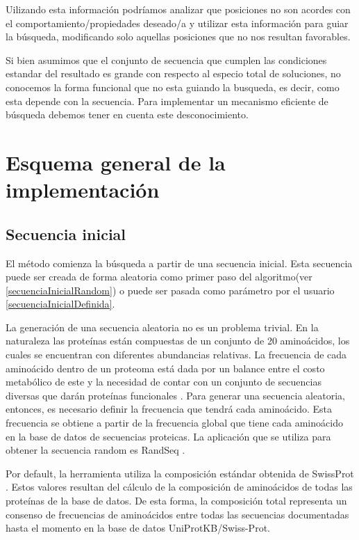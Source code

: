 Uilizando esta información podríamos analizar que posiciones no son acordes con el comportamiento/propiedades deseado/a y utilizar esta información para guiar la búsqueda, modificando solo aquellas posiciones que no nos resultan favorables.
 
Si bien asumimos que el conjunto de secuencia que cumplen las condiciones estandar del resultado es grande con respecto al especio total de soluciones, no conocemos la forma funcional que no esta guiando la busqueda,
es decir, como esta depende con la secuencia.  Para implementar un mecanismo eficiente de búsqueda debemos tener en cuenta este desconocimiento.










\section{Esquema general de la implementación}


\subsection{Secuencia inicial}

El método comienza la búsqueda a partir de una secuencia inicial. 
Esta secuencia puede ser creada de forma aleatoria como primer paso del algoritmo(ver \ref{secuenciaInicialRandom}) o puede ser pasada como parámetro por el usuario \ref{secuenciaInicialDefinida}. 

La generación de una secuencia aleatoria no es un problema trivial. 
En la naturaleza las proteínas están compuestas de un conjunto de 20 aminoácidos, los cuales se encuentran con diferentes abundancias relativas. 
La frecuencia de cada aminoácido dentro de un proteoma está dada por un balance entre el costo metabólico de este y la necesidad de contar con un conjunto de secuencias diversas que darán proteínas funcionales \cite{krick2014amino}. 
Para generar una secuencia aleatoria, entonces, es necesario definir la frecuencia que tendrá cada aminoácido. 
Esta frecuencia se obtiene a partir de la frecuencia global que tiene cada aminoácido en la base de datos de secuencias proteicas.
La aplicación que se utiliza para obtener la secuencia random es RandSeq \cite{randseq}.

Por default, la herramienta utiliza la composición estándar obtenida de SwissProt \cite{compositionAA}.  
Estos valores resultan del cálculo de la composición de aminoácidos de todas las proteínas de la base de datos. 
De esta forma, la composición total representa un consenso de frecuencias de aminoácidos entre todas las secuencias documentadas hasta el momento en la base de datos UniProtKB/Swiss-Prot.

